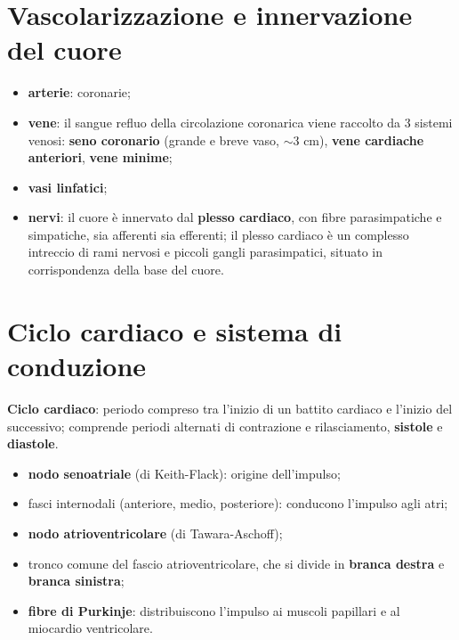 \section{Vascolarizzazione e innervazione del cuore}

\begin{itemize}
  \item \textbf{arterie}: coronarie;
  \item \textbf{vene}: il sangue refluo della circolazione coronarica viene raccolto da 3 sistemi
    venosi: \textbf{seno coronario} (grande e breve vaso, $\sim$3 cm), \textbf{vene cardiache
    anteriori}, \textbf{vene minime};
  \item \textbf{vasi linfatici};
  \item \textbf{nervi}: il cuore è innervato dal \textbf{plesso cardiaco}, con fibre
    parasimpatiche e simpatiche, sia afferenti sia efferenti; il plesso cardiaco è un complesso
    intreccio di rami nervosi e piccoli gangli parasimpatici, situato in corrispondenza della
    base del cuore.
\end{itemize}

\section{Ciclo cardiaco e sistema di conduzione}

\textbf{Ciclo cardiaco}: periodo compreso tra l'inizio di un battito cardiaco e l'inizio del
successivo; comprende periodi alternati di contrazione e rilasciamento, \textbf{sistole} e
\textbf{diastole}.

\begin{itemize}
  \item \textbf{nodo senoatriale} (di Keith-Flack): origine dell'impulso;
  \item fasci internodali (anteriore, medio, posteriore): conducono l'impulso agli atri;
  \item \textbf{nodo atrioventricolare} (di Tawara-Aschoff);
  \item tronco comune del fascio atrioventricolare, che si divide in \textbf{branca destra} e
    \textbf{branca sinistra};
  \item \textbf{fibre di Purkinje}: distribuiscono l'impulso ai muscoli papillari e al miocardio
    ventricolare.
\end{itemize}

